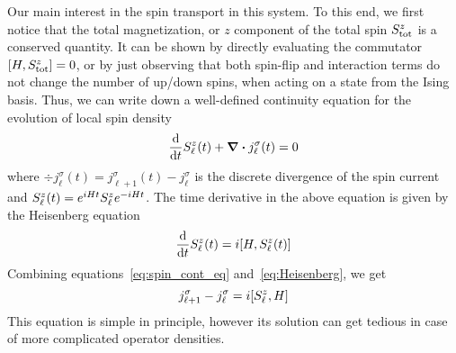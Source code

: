 Our main interest in the spin transport in this system. To this end, we first notice that
the total magnetization, or \(z\) component of the total spin \(S^{z}_{\mathrm{tot}}\)
is a conserved quantity.
It can be shown by directly evaluating the commutator \(\comm{H}{\Sz_{\mathrm{tot}}}=0\), or by just observing
that both spin-flip and interaction terms do not change the number of up/down spins, when acting on a state
from the Ising basis. Thus, we can write down a well-defined continuity equation for the evolution
of local spin density
\begin{equation}
    \dv{t} S^{z}_{\ell}(t) + \div{j^{\sigma}_{\ell}(t)} = 0
    \label{eq:spin_cont_eq}
\end{equation}
where \(\div{j^{\sigma}_{\ell}(t)} = j^{\sigma}_{\ell+1}(t) - j^{\sigma}_{\ell}\) is the
discrete divergence of the spin current and \(S^{z}_{\ell}(t) = e^{i H t} S^{z}_{\ell} e^{-i H t}\).
The time derivative in the above equation is given by the Heisenberg equation
\begin{equation}
    \dv{t} \Sz_{\ell}(t) = i \comm{H}{\Sz_{\ell}(t)}
    \label{eq:Heisenberg}
\end{equation}
Combining equations~\eqref{eq:spin_cont_eq} and~\eqref{eq:Heisenberg}, we get
\begin{equation}
    j^{\sigma}_{\ell+1} - j^{\sigma}_{\ell} = i\comm{\Sz_{\ell}}{H}
\end{equation}
This equation is simple in principle, however its solution can get tedious in case of more complicated
operator densities. 

